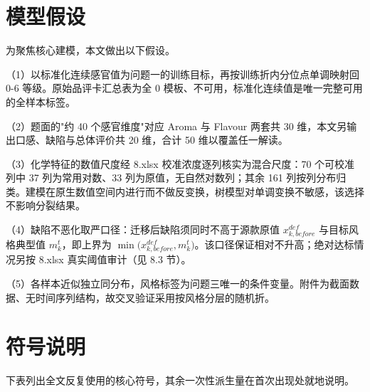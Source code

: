 \documentclass[zihao=-4,a4paper,UTF8,fontset=none]{ctexart}
\begin{document}
\section{模型假设}

为聚焦核心建模，本文做出以下假设。

（1）以标准化连续感官值为问题一的训练目标，再按训练折内分位点单调映射回 0-6 等级。原始品评卡汇总表为全 0 模板、不可用，标准化连续值是唯一完整可用的全样本标签。

（2）题面的"约 40 个感官维度"对应 Aroma 与 Flavour 两套共 30 维，本文另输出口感、缺陷与总体评价共 20 维，合计 50 维以覆盖任一解读。

（3）化学特征的数值尺度经 8.xlsx 校准浓度逐列核实为混合尺度：70 个可校准列中 37 列为常用对数、33 列为原值，无自然对数列；其余 161 列按列分布归类。建模在原生数值空间内进行而不做反变换，树模型对单调变换不敏感，该选择不影响分裂结果。

（4）缺陷不恶化取严口径：迁移后缺陷须同时不高于源款原值 $x^{def}_{k,before}$ 与目标风格典型值 $m^t_k$，即上界为 $\min\!\big(x^{def}_{k,before},m^t_k\big)$。该口径保证相对不升高；绝对达标情况另按 8.xlsx 真实阈值审计（见 8.3 节）。

（5）各样本近似独立同分布，风格标签为问题三唯一的条件变量。附件为截面数据、无时间序列结构，故交叉验证采用按风格分层的随机折。

\section{符号说明}

下表列出全文反复使用的核心符号，其余一次性派生量在首次出现处就地说明。
\end{document}
